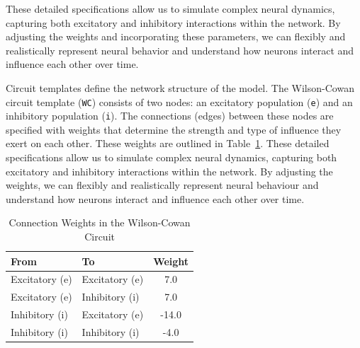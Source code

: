 \documentclass[12pt]{article}
\begin{document}
These detailed specifications allow us to simulate complex neural dynamics, capturing both excitatory and inhibitory interactions within the network. By adjusting the weights and incorporating these parameters, we can flexibly and realistically represent neural behavior and understand how neurons interact and influence each other over time.


Circuit templates define the network structure of the model. The Wilson-Cowan circuit template (\texttt{WC}) consists of two nodes: an excitatory population (\texttt{e}) and an inhibitory population (\texttt{i}). The connections (edges) between these nodes are specified with weights that determine the strength and type of influence they exert on each other. These weights are outlined in Table~\ref{tab:weights}. These detailed specifications allow us to simulate complex neural dynamics, capturing both excitatory and inhibitory interactions within the network. By adjusting the weights, we can flexibly and realistically represent neural behaviour and understand how neurons interact and influence each other over time.

\begin{table}[h]
    \centering
    \caption{Connection Weights in the Wilson-Cowan Circuit}
    \label{tab:weights}
    \begin{tabular}{@{}llc@{}}
        \toprule
        \textbf{From} & \textbf{To} & \textbf{Weight} \\ \midrule
        Excitatory (e) & Excitatory (e) & 7.0 \\
        Excitatory (e) & Inhibitory (i) & 7.0 \\
        Inhibitory (i) & Excitatory (e) & -14.0 \\
        Inhibitory (i) & Inhibitory (i) & -4.0 \\ \bottomrule
    \end{tabular}
\end{table}
\end{document}
